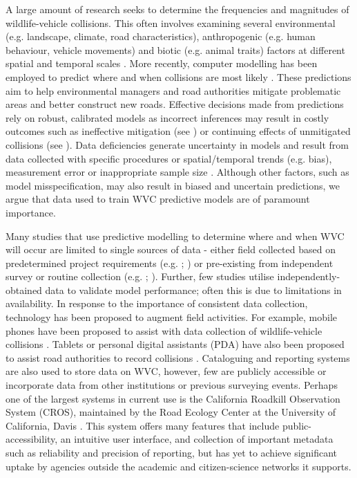 A large amount of research seeks to determine the frequencies and magnitudes of wildlife-vehicle collisions. This often involves examining several environmental (e.g. landscape, climate, road characteristics), anthropogenic (e.g. human behaviour, vehicle movements) and biotic (e.g. animal traits) factors at different spatial and temporal scales \citep{litv08}. More recently, computer modelling has been employed to predict where and when collisions are most likely \citep{guns11}. These predictions aim to help environmental managers and road authorities mitigate problematic areas and better construct new roads. Effective decisions made from predictions rely on robust, calibrated models as incorrect inferences may result in costly outcomes such as ineffective mitigation (see \cite{huij09}) or continuing effects of unmitigated collisions (see \cite{biss08b}). Data deficiencies generate uncertainty in models and result from data collected with specific procedures or spatial/temporal trends (e.g. bias), measurement error or inappropriate sample size \citep{bean12}.  Although other factors, such as model misspecification, may also result in biased and uncertain predictions, we argue that data used to train WVC predictive models are of paramount importance.

Many studies that use predictive modelling to determine where and when WVC will occur are limited to single sources of data - either field collected based on predetermined project requirements (e.g. \cite{lang09}; \cite{roge09}) or pre-existing from independent survey or routine collection (e.g. \cite{hoth12}; \cite{malo04}). Further, few studies utilise independently-obtained data to validate model performance; often this is due to limitations in availability. In response to the importance of consistent data collection, technology has been proposed to augment field activities. For example, mobile phones have been proposed to assist with data collection of wildlife-vehicle collisions \citep{aane09,olso14}. Tablets or personal digital assistants (PDA) have also been proposed to assist road authorities to record collisions \citep{amen07}. Cataloguing and reporting systems are also used to store data on WVC, however, few are publicly accessible or incorporate data from other institutions or previous surveying events. Perhaps one of the largest systems in current use is the California Roadkill Observation System (CROS), maintained by the Road Ecology Center at the University of California, Davis \citep{shil15b}. This system offers many features that include public-accessibility, an intuitive user interface, and collection of important metadata such as reliability and precision of reporting, but has yet to achieve significant uptake by agencies outside the academic and citizen-science networks it supports.

